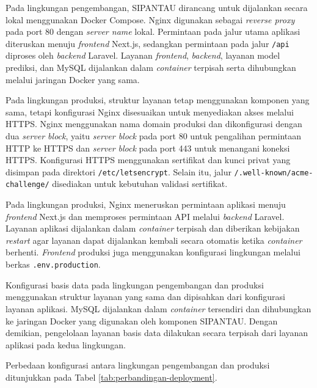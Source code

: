 Pada lingkungan pengembangan, SIPANTAU dirancang untuk dijalankan secara lokal menggunakan Docker Compose. Nginx digunakan sebagai \textit{reverse proxy} pada port 80 dengan \textit{server name} lokal. Permintaan pada jalur utama aplikasi diteruskan menuju \textit{frontend} Next.js, sedangkan permintaan pada jalur \texttt{/api} diproses oleh \textit{backend} Laravel. Layanan \textit{frontend}, \textit{backend}, layanan model prediksi, dan MySQL dijalankan dalam \textit{container} terpisah serta dihubungkan melalui jaringan Docker yang sama.

Pada lingkungan produksi, struktur layanan tetap menggunakan komponen yang sama, tetapi konfigurasi Nginx disesuaikan untuk menyediakan akses melalui HTTPS. Nginx menggunakan nama domain produksi dan dikonfigurasi dengan dua \textit{server block}, yaitu \textit{server block} pada port 80 untuk pengalihan permintaan HTTP ke HTTPS dan \textit{server block} pada port 443 untuk menangani koneksi HTTPS. Konfigurasi HTTPS menggunakan sertifikat dan kunci privat yang disimpan pada direktori \texttt{/etc/letsencrypt}. Selain itu, jalur \texttt{/.well-known/acme-challenge/} disediakan untuk kebutuhan validasi sertifikat.

Pada lingkungan produksi, Nginx meneruskan permintaan aplikasi menuju \textit{frontend} Next.js dan memproses permintaan API melalui \textit{backend} Laravel. Layanan aplikasi dijalankan dalam \textit{container} terpisah dan diberikan kebijakan \textit{restart} agar layanan dapat dijalankan kembali secara otomatis ketika \textit{container} berhenti. \textit{Frontend} produksi juga menggunakan konfigurasi lingkungan melalui berkas \texttt{.env.\allowbreak production}.

Konfigurasi basis data pada lingkungan pengembangan dan produksi menggunakan struktur layanan yang sama dan dipisahkan dari konfigurasi layanan aplikasi. MySQL dijalankan dalam \textit{container} tersendiri dan dihubungkan ke jaringan Docker yang digunakan oleh komponen SIPANTAU. Dengan demikian, pengelolaan layanan basis data dilakukan secara terpisah dari layanan aplikasi pada kedua lingkungan.

Perbedaan konfigurasi antara lingkungan pengembangan dan produksi ditunjukkan pada Tabel \ref{tab:perbandingan-deployment}.

